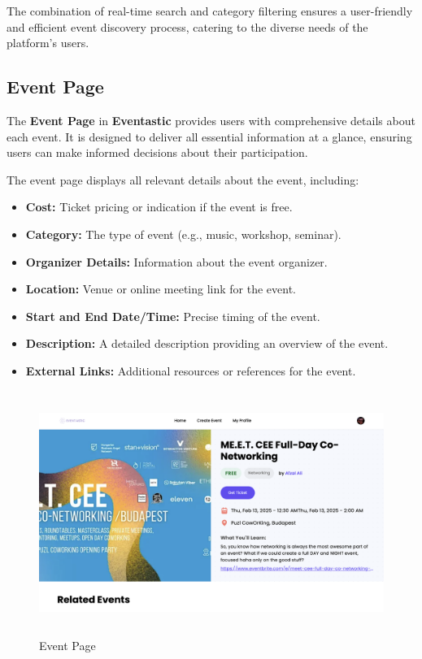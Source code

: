 The combination of real-time search and category filtering ensures a user-friendly and efficient event discovery process, catering to the diverse needs of the platform’s users.


\subsection{Event Page}

The \textbf{Event Page} in \textbf{Eventastic} provides users with comprehensive details about each event. It is designed to deliver all essential information at a glance, ensuring users can make informed decisions about their participation. 

The event page displays all relevant details about the event, including:
\begin{itemize}
    \item \textbf{Cost:} Ticket pricing or indication if the event is free.
    \item \textbf{Category:} The type of event (e.g., music, workshop, seminar).
    \item \textbf{Organizer Details:} Information about the event organizer.
    \item \textbf{Location:} Venue or online meeting link for the event.
    \item \textbf{Start and End Date/Time:} Precise timing of the event.
    \item \textbf{Description:} A detailed description providing an overview of the event.
    \item \textbf{External Links:} Additional resources or references for the event.
\end{itemize}

\begin{figure}[H]
	\centering	\includegraphics[width=1.0\textwidth,height=300px,frame]{images/event.png}
	\caption{Event Page}
        \label{fig:event}
\end{figure}

